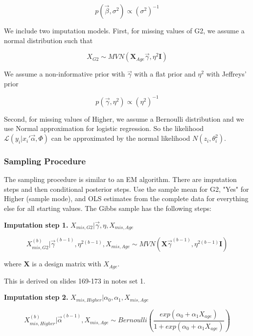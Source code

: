 \documentclass[11pt]{article}
\begin{document}
$$p(\vec{\beta}, \sigma^2) \propto (\sigma^2)^{-1}$$

\vspace{0.25in}

We include two imputation models. First, for missing values of G2, we assume a normal distribution such that

$$X_{G2} \sim MVN(\mathbf{X}_{Age}\vec{\gamma}, \eta^2\mathbf{I})$$

We assume a non-informative prior with $\vec{\gamma}$ with a flat prior and $\eta^2$ with Jeffreys' prior

$$p(\vec{\gamma}, \eta^2) \propto (\eta^2)^{-1}$$

\vspace{0.25in}

Second, for missing values of Higher, we assume a Bernoulli distribution and we use Normal approximation for logistic regression. So the likelihood $\mathcal{L}(y_i|x_i'\vec\alpha, \Phi)$ can be approximated by the normal likelihood $N(z_i, \theta^2_i)$.

\subsubsection{Sampling Procedure}

The sampling procedure is similar to an EM algorithm. There are imputation steps and then conditional posterior steps. Use the sample mean for G2, "Yes" for Higher (sample mode), and OLS estimates from the complete data for everything else for all starting values. The Gibbs sample has the following steps:

\vspace{0.25in}

\textbf{Imputation step 1.} $X_{mis, G2}|\vec\gamma, \eta, X_{mis, Age}$

$$X_{mis, G2}^{(b)}|\vec\gamma^{(b - 1)}, \eta^{2(b - 1)}, X_{mis, Age} \sim MVN(\mathbf{X}\vec{\gamma}^{(b - 1)}, \eta^{2(b - 1)}\mathbf{I})$$

where $\mathbf{X}$ is a design matrix with $X_{Age}$.

This is derived on slides 169-173 in notes set 1.

\vspace{0.25in}

\textbf{Imputation step 2.} $X_{mis, Higher}|\alpha_0, \alpha_1, X_{mis, Age}$

$$X_{mis, Higher}^{(b)}|\vec\alpha^{(b - 1)}, X_{mis, Age} \sim Bernoulli\left(\frac{exp(\alpha_0 + \alpha_1X_{age})}{1 + exp(\alpha_0 + \alpha_1X_{age})}\right)$$
\end{document}
